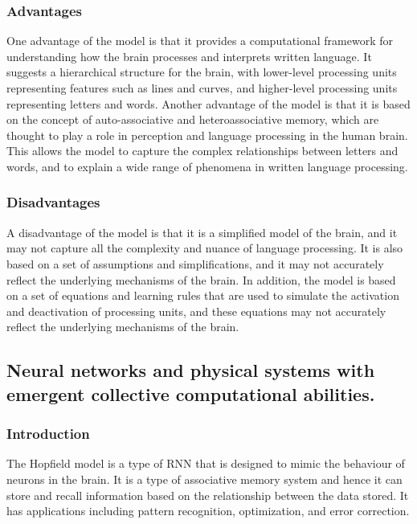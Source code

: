 \subsubsection{Advantages }
One advantage of the model is that it provides a computational framework for
understanding how the brain processes and interprets written language. It
suggests a hierarchical structure for the brain, with lower-level processing
units representing features such as lines and curves, and higher-level
processing units representing letters and words. Another advantage of the model
is that it is based on the concept of auto-associative and heteroassociative
memory, which are thought to play a role in perception and language processing
in the human brain. This allows the model to capture the complex relationships
between letters and words, and to explain a wide range of phenomena in written
language processing.

\subsubsection{Disadvantages}
A disadvantage of the model is that it is a simplified model of the brain, and
it may not capture all the complexity and nuance of language processing. It is
also based on a set of assumptions and simplifications, and it may not
accurately reflect the underlying mechanisms of the brain. In addition, the
model is based on a set of equations and learning rules that are used to
simulate the activation and deactivation of processing units, and these
equations may not accurately reflect the underlying mechanisms of the brain.

\subsection{Neural networks and physical systems with emergent collective computational abilities.}
\subsubsection{Introduction}
The Hopfield model\cite{hopfield} is a type of RNN that is designed to mimic
the behaviour of neurons in the brain. It is a type of associative memory
system and hence it can store and recall information based on the relationship
between the data stored. It has applications including pattern recognition,
optimization, and error correction.
